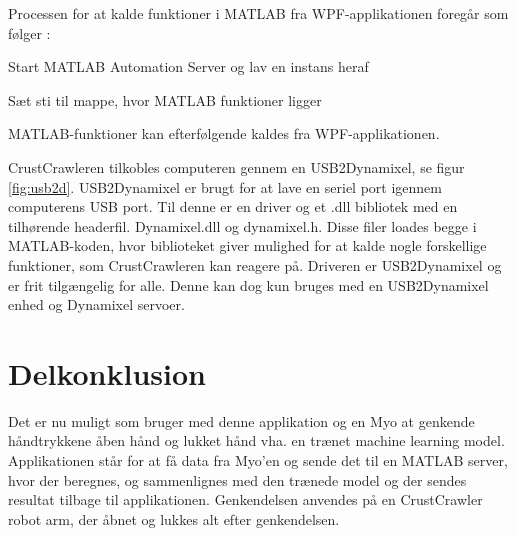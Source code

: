 
Processen for at kalde funktioner i MATLAB fra WPF-applikationen foregår som følger \citep{RefWorks:15}:
\begin{myEnumerate}
	\item Start MATLAB Automation Server og lav en instans heraf
	\item Sæt sti til mappe, hvor MATLAB funktioner ligger
	\item MATLAB-funktioner kan efterfølgende kaldes fra WPF-applikationen.
\end{myEnumerate}


CrustCrawleren tilkobles computeren gennem en USB2Dynamixel, se figur \ref{fig:usb2d}. USB2Dynamixel er brugt for at lave en seriel port igennem computerens USB port. Til denne er en driver og et .dll bibliotek med en tilhørende headerfil. Dynamixel.dll og dynamixel.h. Disse filer loades begge i MATLAB-koden, hvor biblioteket giver mulighed for at kalde nogle forskellige funktioner, som CrustCrawleren kan reagere på. Driveren er USB2Dynamixel \citep{agaverobot} og er frit tilgængelig for alle. Denne kan dog kun bruges med en USB2Dynamixel enhed og Dynamixel servoer.

\section{Delkonklusion}
Det er nu muligt som bruger med denne applikation og en Myo at genkende håndtrykkene åben hånd og lukket hånd vha. en trænet machine learning model. Applikationen står for at få data fra Myo'en og sende det til en MATLAB server, hvor der beregnes, og sammenlignes med den trænede model og der sendes resultat tilbage til applikationen. Genkendelsen anvendes på en CrustCrawler robot arm, der åbnet og lukkes alt efter genkendelsen.